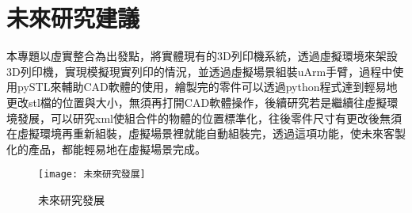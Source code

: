 \chapter{未來研究建議}

本專題以虛實整合為出發點，將實體現有的3D列印機系統，透過虛擬環境來架設3D列印機，實現模擬現實列印的情況，並透過虛擬場景組裝uArm手臂，過程中使用pySTL來輔助CAD軟體的使用，繪製完的零件可以透過python程式達到輕易地更改stl檔的位置與大小，無須再打開CAD軟體操作，後續研究若是繼續往虛擬環境發展，可以研究xml使組合件的物體的位置標準化，往後零件尺寸有更改後無須在虛擬環境再重新組裝，虛擬場景裡就能自動組裝完，透過這項功能，使未來客製化的產品，都能輕易地在虛擬場景完成。 \\


\begin{figure}[hbt!]
\begin{center}
\texttt{[image: 未來研究發展]}
\caption{\Large 未來研究發展}\label{未來研究發展}
\end{center}
\end{figure}

